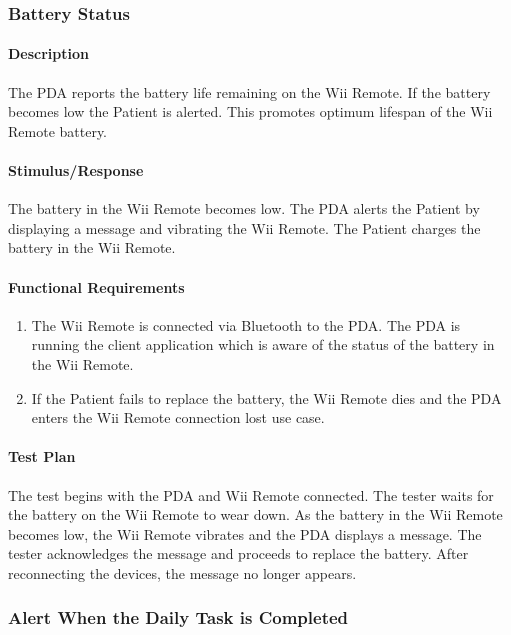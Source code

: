 \documentclass{article}
\begin{document}
\subsubsection{Battery Status}\label{sec: Battery Status}

\paragraph{Description}
The PDA reports the battery life remaining on the Wii Remote.  If the battery becomes low the Patient is alerted.  This promotes optimum lifespan of the Wii Remote battery.

\paragraph{Stimulus/Response}
The battery in the Wii Remote becomes low.  The PDA alerts the Patient by displaying a message and vibrating the Wii Remote. The Patient charges the battery in the Wii Remote.

\paragraph{Functional Requirements}
\begin{enumerate}
\item The Wii Remote is connected via Bluetooth to the PDA. The PDA is running the client application which is aware of the status of the battery in the Wii Remote.
\item If the Patient fails to replace the battery, the Wii Remote dies and the PDA enters the Wii Remote connection lost use case.
\end{enumerate}

\paragraph{Test Plan}
The test begins with the PDA and Wii Remote connected.  The tester waits for the battery on the Wii Remote to wear down.  As the battery in the Wii Remote becomes low, the Wii Remote vibrates and the PDA displays a message.  The tester acknowledges the message and proceeds to replace the battery. After reconnecting the devices, the message no longer appears.

\subsubsection{Alert When the Daily Task is Completed}\label{sec: Task Completed}
\end{document}
